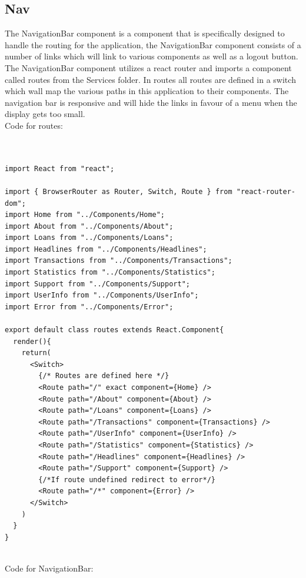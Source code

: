 \subsection{Nav}
The NavigationBar component is a component that is specifically designed to handle the routing
for the application, the NavigationBar component consists of a number of links which will link
to various components as well as a logout button.
The NavigationBar component utilizes a react router and imports a component
called routes from the Services folder.  In routes all routes are defined in a switch which
wall map the various paths in this application to their components.  The navigation bar is responsive
and will hide the links in favour of a menu when the display gets too small.
\\
Code for routes:
\begin{verbatim}


import React from "react";

import { BrowserRouter as Router, Switch, Route } from "react-router-dom";
import Home from "../Components/Home";
import About from "../Components/About";
import Loans from "../Components/Loans";
import Headlines from "../Components/Headlines";
import Transactions from "../Components/Transactions";
import Statistics from "../Components/Statistics";
import Support from "../Components/Support";
import UserInfo from "../Components/UserInfo";
import Error from "../Components/Error";

export default class routes extends React.Component{
  render(){
    return(
      <Switch>
        {/* Routes are defined here */}
        <Route path="/" exact component={Home} />
        <Route path="/About" component={About} />
        <Route path="/Loans" component={Loans} />
        <Route path="/Transactions" component={Transactions} />
        <Route path="/UserInfo" component={UserInfo} />
        <Route path="/Statistics" component={Statistics} />
        <Route path="/Headlines" component={Headlines} />
        <Route path="/Support" component={Support} />
        {/*If route undefined redirect to error*/}
        <Route path="/*" component={Error} />
      </Switch>
    )
  }
}

\end{verbatim}
\\
Code for NavigationBar:
